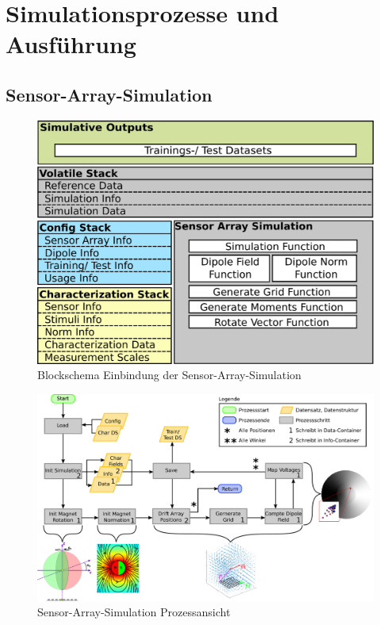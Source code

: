 %

\section{Simulationsprozesse und Ausführung}\label{sec:sim-pro}


\subsection{Sensor-Array-Simulation}\label{sub:sensor-array-pro}


\begin{figure}[tbph]
	\centering
	\includegraphics[width=0.7\linewidth]{chapters/images/3-SW-E-OExp/Blockschema_Sensor-Array}
	\caption[Blockschema Einbindung der Sensor-Array-Simulation]{Blockschema Einbindung der Sensor-Array-Simulation}
	\label{fig:blockschemasensor-array}
\end{figure}


\clearpage


\begin{figure}[tbph]
	\centering
	\includegraphics[width=\linewidth]{chapters/images/3-SW-E-OExp/Sensor-Array-Simulation}
	\caption[Sensor-Array-Simulation Prozessansicht]{Sensor-Array-Simulation Prozessansicht}
	\label{fig:sensor-array-simulation}
\end{figure}



